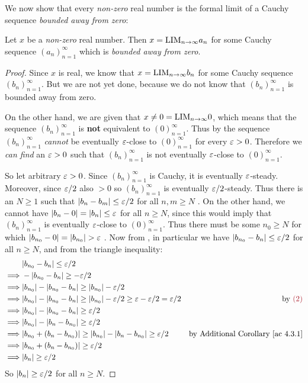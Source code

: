 We now show that every \emph{non-zero} real number is the formal limit of a Cauchy sequence \emph{bounded away from zero}:
\begin{lemma} \label{lem 5.3.14}
Let \(x\) be a \emph{non-zero} real number.
Then \(x = \text{LIM}_{n \to \infty} a_n\) for some Cauchy sequence \((a_n)_{n = 1}^{\infty}\) which is \emph{bounded away from zero}.
\end{lemma}

\begin{proof}
Since \(x\) is real, we know that \(x = \text{LIM}_{n \to \infty} b_n\) for some Cauchy sequence \((b_n)_{n = 1}^{\infty}\).
But we are not yet done, because we do not know that \((b_n)_{n = 1}^{\infty}\) is bounded away from zero.

On the other hand, we are given that \(x \ne 0 = \text{LIM}_{n \to \infty} 0\), which means that the sequence \((b_n)_{n = 1}^{\infty}\) is \textbf{not} equivalent to \((0)_{n = 1}^{\infty}\).
Thus by  the sequence \((b_n)_{n = 1}^{\infty}\) \emph{cannot} be eventually \(\varepsilon\)-close to \((0)_{n = 1}^{\infty}\) for every \(\varepsilon > 0\).
Therefore we \emph{can find} an \(\varepsilon >  0\) such that \((b_n)_{n = 1}^{\infty}\) is not eventually \(\varepsilon\)-close to \((0)_{n = 1}^{\infty}\).

So let arbitrary \(\varepsilon > 0\).
Since \((b_n)_{n = 1}^{\infty}\) is Cauchy, it is eventually \(\varepsilon\)-steady.
Moreover, since \(\varepsilon/2\) also \(> 0\) so \((b_n)_{n = 1}^{\infty}\) is eventually \(\varepsilon/2\)-steady.
Thus there is an \(N \ge 1\) such that \(\lvert b_n - b_m\rvert \le \varepsilon/2\) for all \(n, m \ge N\) .
On the other hand, we cannot have \(\lvert b_n - 0\rvert = \lvert b_n\rvert \le \varepsilon\) for all \(n \ge N\), 
since this would imply that \((b_n)_{n = 1}^{\infty}\) is eventually \(\varepsilon\)-close to \((0)_{n = 1}^{\infty}\).
Thus there must be some \(n_0 \ge N\) for which \(\lvert b_{n_0} - 0\rvert = \lvert b_{n_0}\rvert > \varepsilon\) .
Now from , in particular we have \(\lvert b_{n_0} - b_n\rvert \le \varepsilon/2\) for all \(n \ge N\),
and from the triangle inequality:
\begin{align*}
	         & \abs{b_{n_0} - b_n} \le \varE/2 \\
    \implies & -\abs{b_{n_0} - b_n} \ge -\varE/2 \\
    \implies & \abs{b_{n_0}} - \abs{b_{n_0} - b_n} \ge \abs{b_{n_0}} - \varE/2 \\
    \implies & \abs{b_{n_0}} - \abs{b_{n_0} - b_n} \ge \abs{b_{n_0}} - \varE/2 \ge \varE - \varE/2 = \varE/2 & \text{by \MAROON{(2)}}\\
    \implies & \abs{b_{n_0}} - \abs{b_{n_0} - b_n} \ge \varE/2 \\
    \implies & \abs{b_{n_0}} - \abs{b_n - b_{n_0}} \ge \varE/2 \\
    \implies & \abs{b_{n_0} + (b_n - b_{n_0})} \ge \abs{b_{n_0}} - \abs{b_n - b_{n_0}} \ge \varE/2 & \text{by \AC{4.3.1}} \\
    \implies & \abs{b_{n_0} + (b_n - b_{n_0})} \ge \varE/2 \\
    \implies & \abs{b_n} \ge \varE/2
\end{align*}
So \(\lvert b_n\rvert \ge \varepsilon/2\) for all \(n \ge N\).


\end{proof}

